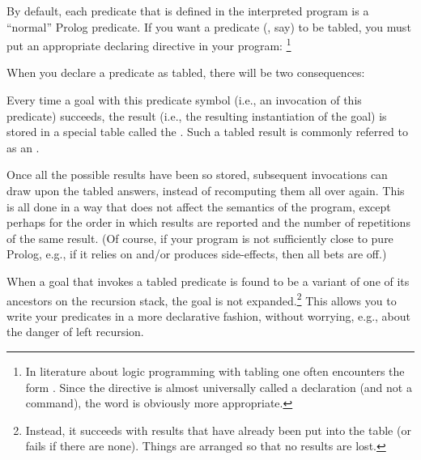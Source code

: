 %
%

By default, each predicate that is defined in the interpreted program is a
``normal'' Prolog predicate.  If you want a predicate (, say) to be
tabled, you must put an appropriate declaring directive in your
program:%
\footnote{
    In literature about logic programming with tabling one often
    encounters the form .  Since the directive is
    almost universally called a declaration (and not a command), the word
     is obviously more appropriate.}\\
\ind{}\label{dir:tabled}

When you declare a predicate as tabled, there will be
two consequences:
\begin{Enumerate}
\item
  Every time a goal with this predicate symbol (i.e., an invocation of this
  predicate) succeeds, the result (i.e., the resulting instantiation of the
  goal) is stored in a special table called the .  Such a tabled result is commonly
  referred to as an .

  Once all the possible results have been so stored, subsequent invocations
  can draw upon the tabled answers, instead of recomputing them all over
  again. This is all done in a way that does not affect the semantics of the
  program, except perhaps for the order in which results are reported and the
  number of repetitions of the same result. (Of course, if your program is
  not sufficiently close to pure Prolog, e.g., if it relies on and/or
  produces side-effects, then all bets are off.)

\item
  When a goal that invokes a tabled predicate is found to be a variant of one
  of its ancestors on the recursion stack, the goal is not
  expanded.\footnote{
    Instead, it succeeds with results that have already been put into the
    table (or fails if there are none).  Things are arranged so that no
    results are lost.}
  This allows you to write your predicates in a more declarative fashion,
  without worrying, e.g., about the danger of left recursion.
\end{Enumerate}


